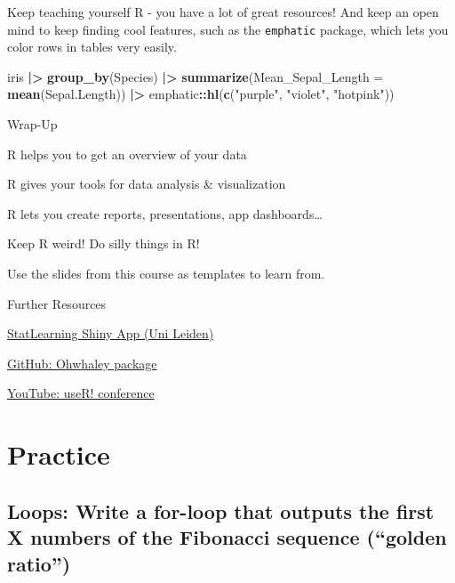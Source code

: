 \documentclass[
]{book}
\newenvironment{Shaded}{\begin{snugshade}}{\end{snugshade}}
\newcommand{\AttributeTok}[1]{\textcolor[rgb]{0.13,0.29,0.53}{#1}}
\newcommand{\FunctionTok}[1]{\textcolor[rgb]{0.13,0.29,0.53}{\textbf{#1}}}
\newcommand{\NormalTok}[1]{#1}
\newcommand{\SpecialCharTok}[1]{\textcolor[rgb]{0.81,0.36,0.00}{\textbf{#1}}}
\newcommand{\StringTok}[1]{\textcolor[rgb]{0.31,0.60,0.02}{#1}}
\begin{document}
Keep teaching yourself R - you have a lot of great resources!
And keep an open mind to keep finding cool features, such as the \texttt{emphatic} package, which lets you color rows in tables very easily.

\begin{Shaded}
\begin{Highlighting}[]
\NormalTok{iris }\SpecialCharTok{|\textgreater{}} 
  \FunctionTok{group\_by}\NormalTok{(Species) }\SpecialCharTok{|\textgreater{}} 
  \FunctionTok{summarize}\NormalTok{(}\AttributeTok{Mean\_Sepal\_Length =} \FunctionTok{mean}\NormalTok{(Sepal.Length)) }\SpecialCharTok{|\textgreater{}} 
\NormalTok{  emphatic}\SpecialCharTok{::}\FunctionTok{hl}\NormalTok{(}\FunctionTok{c}\NormalTok{(}\StringTok{"purple"}\NormalTok{, }\StringTok{"violet"}\NormalTok{, }\StringTok{"hotpink"}\NormalTok{))}
\end{Highlighting}
\end{Shaded}

Wrap-Up

R helps you to get an overview of your data

R gives your tools for data analysis \& visualization

R lets you create reports, presentations, app dashboards\ldots{}

Keep R weird! Do silly things in R!

Use the slides from this course as templates to learn from.

Further Resources

\href{https://solo-fsw.shinyapps.io/NewStatLearning/}{StatLearning Shiny App (Uni Leiden)}

\href{https://github.com/fontikar/ohwhaley}{GitHub: Ohwhaley package}

\href{https://www.youtube.com/@useRConference_global}{YouTube: useR! conference}

\chapter*{Practice}\label{practice}

\section{Loops: Write a for-loop that outputs the first X numbers of the Fibonacci sequence (``golden ratio'')}\label{loops-write-a-for-loop-that-outputs-the-first-x-numbers-of-the-fibonacci-sequence-golden-ratio}
\end{document}
